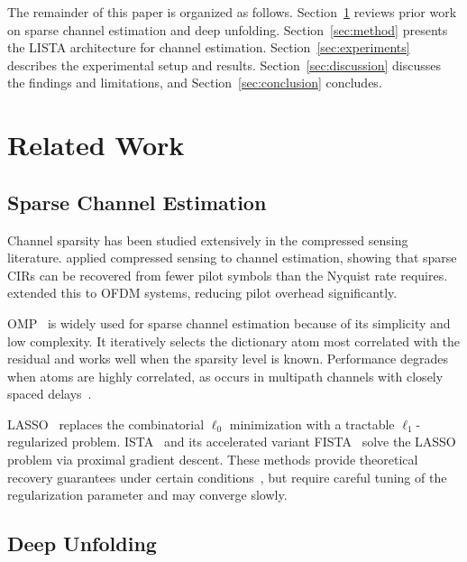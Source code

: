 \documentclass[a4paper,fleqn]{cas-sc}
\begin{document}
The remainder of this paper is organized as follows. Section~\ref{sec:related} reviews prior work on sparse channel estimation and deep unfolding. Section~\ref{sec:method} presents the LISTA architecture for channel estimation. Section~\ref{sec:experiments} describes the experimental setup and results. Section~\ref{sec:discussion} discusses the findings and limitations, and Section~\ref{sec:conclusion} concludes.


\section{Related Work}\label{sec:related}

\subsection{Sparse Channel Estimation}

Channel sparsity has been studied extensively in the compressed sensing literature. \citet{bajwa2010compressed} applied compressed sensing to channel estimation, showing that sparse CIRs can be recovered from fewer pilot symbols than the Nyquist rate requires. \citet{berger2010application} extended this to OFDM systems, reducing pilot overhead significantly.

OMP~\citep{tropp2007signal} is widely used for sparse channel estimation because of its simplicity and low complexity. It iteratively selects the dictionary atom most correlated with the residual and works well when the sparsity level is known. Performance degrades when atoms are highly correlated, as occurs in multipath channels with closely spaced delays~\citep{cai2011analysis}.

LASSO~\citep{tibshirani1996regression} replaces the combinatorial $\ell_0$ minimization with a tractable $\ell_1$-regularized problem. ISTA~\citep{daubechies2004iterative, beck2009fast} and its accelerated variant FISTA~\citep{beck2009fast} solve the LASSO problem via proximal gradient descent. These methods provide theoretical recovery guarantees under certain conditions~\citep{candes2006robust}, but require careful tuning of the regularization parameter and may converge slowly.

\subsection{Deep Unfolding}
\end{document}
